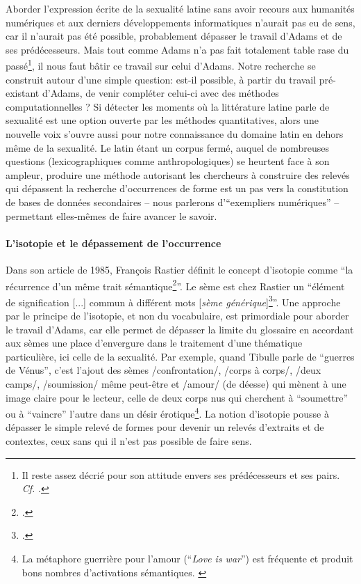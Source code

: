 Aborder l'expression écrite de la sexualité latine sans avoir recours aux humanités numériques et aux derniers développements informatiques n'aurait pas eu de sens, car il n'aurait pas été possible, probablement dépasser le travail d'Adams et de ses prédécesseurs. Mais tout comme Adams n'a pas fait totalement table rase du passé\footnote{Il reste assez décrié pour son attitude envers ses prédécesseurs et ses pairs. \textit{Cf.} \textcite{richlin_sexual_1978}.}, il nous faut bâtir ce travail sur celui d'Adams. Notre recherche se construit autour d'une simple question: est-il possible, à partir du travail pré-existant d'Adams, de venir compléter celui-ci avec des méthodes computationnelles ? Si détecter les moments où la littérature latine parle de sexualité est une option ouverte par les méthodes quantitatives, alors une nouvelle voix s'ouvre aussi pour notre connaissance du domaine latin en dehors même de la sexualité. Le latin étant un corpus fermé, auquel de nombreuses questions (lexicographiques comme anthropologiques) se heurtent face à son ampleur, produire une méthode autorisant les chercheurs à construire des relevés qui dépassent la recherche d'occurrences de forme est un pas vers la constitution de bases de données secondaires -- nous parlerons d'\enquote{exempliers numériques} -- permettant elles-mêmes de faire avancer le savoir.

\paragraph{L'isotopie et le dépassement de l'occurrence}

Dans son article de 1985, François Rastier définit le concept d'isotopie comme \enquote{la récurrence d'un même trait sémantique\footcite{rastier_isotopie_1985}}. Le sème est chez Rastier un \enquote{élément de signification {[...]} commun à différent mots {[}\textit{sème générique}{]}\footcite{pincemin1999semantique}}. Une approche par le principe de l'isotopie, et non du vocabulaire, est primordiale pour aborder le travail d'Adams, car elle permet de dépasser la limite du glossaire en accordant aux sèmes une place d'envergure dans le traitement d'une thématique particulière, ici celle de la sexualité. Par exemple, quand Tibulle parle de \enquote{guerres de Vénus}, c'est l'ajout des sèmes /confrontation/, /corps à corps/, /deux camps/, /soumission/ même peut-être et /amour/ (de déesse) qui mènent à une image claire pour le lecteur, celle de deux corps nus qui cherchent à \enquote{soumettre} ou à \enquote{vaincre} l'autre dans un désir érotique\footnote{La métaphore guerrière pour l'amour (\enquote{\textit{Love is war}}) est fréquente et produit bons nombres d'activations sémantiques. \textcite{lakoff_metaphors_2003}}. La notion d'isotopie pousse à dépasser le simple relevé de formes pour devenir un relevés d'extraits et de contextes, ceux sans qui il n'est pas possible de faire sens.

